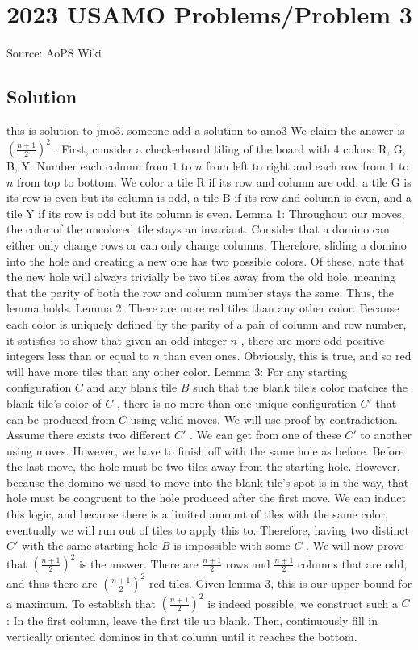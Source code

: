 \documentclass[12pt]{article}
\begin{document}
\section*{{2023 USAMO Problems/Problem 3}}
Source: AoPS Wiki

\subsection*{Solution}
this is solution to jmo3. someone add a solution to amo3 We claim the answer is $(\frac{n+1}{2})^2$ . First, consider a checkerboard tiling of the board with 4 colors: R, G, B, Y. Number each column from $1$ to $n$ from left to right and each row from $1$ to $n$ from top to bottom. We color a tile R if its row and column are odd, a tile G is its row is even but its column is odd, a tile B if its row and column is even, and a tile Y if its row is odd but its column is even. Lemma 1: Throughout our moves, the color of the uncolored tile stays an invariant. Consider that a domino can either only change rows or can only change columns. Therefore, sliding a domino into the hole and creating a new one has two possible colors. Of these, note that the new hole will always trivially be two tiles away from the old hole, meaning that the parity of both the row and column number stays the same. Thus, the lemma holds. Lemma 2: There are more red tiles than any other color.
Because each color is uniquely defined by the parity of a pair of column and row number, it satisfies to show that given an odd integer $n$ , there are more odd positive integers less than or equal to $n$ than even ones. Obviously, this is true, and so red will have more tiles than any other color. Lemma 3: For any starting configuration $C$ and any blank tile $B$ such that the blank tile's color matches the blank tile's color of $C$ , there is no more than one unique configuration $C'$ that can be produced from $C$ using valid moves. We will use proof by contradiction. Assume there exists two different $C'$ . We can get from one of these $C'$ to another using moves. However, we have to finish off with the same hole as before. Before the last move, the hole must be two tiles away from the starting hole. However, because the domino we used to move into the blank tile's spot is in the way, that hole must be congruent to the hole produced after the first move. We can induct this logic, and because there is a limited amount of tiles with the same color, eventually we will run out of tiles to apply this to. Therefore, having two distinct $C'$ with the same starting hole $B$ is impossible with some $C$ . We will now prove that $(\frac{n+1}{2})^2$ is the answer. There are $\frac{n+1}{2}$ rows and $\frac{n+1}{2}$ columns that are odd, and thus there are $(\frac{n+1}{2})^2$ red tiles. Given lemma 3, this is our upper bound for a maximum. To establish that $(\frac{n+1}{2})^2$ is indeed possible, we construct such a $C$ : In the first column, leave the first tile up blank. Then, continuously fill in vertically oriented dominos in that column until it reaches the bottom.
\end{document}
